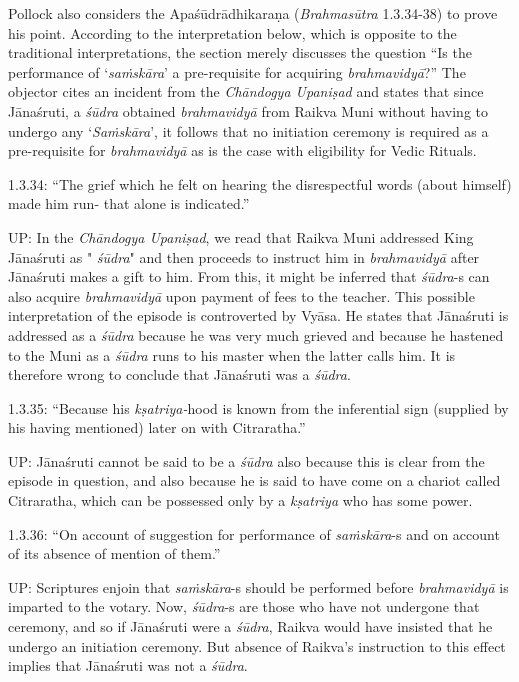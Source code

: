 Pollock also considers the Apaśūdrādhikaraṇa (\textit{Brahmasūtra} 1.3.34-38) to prove his point. According to the interpretation below, which is opposite to the traditional interpretations, the section merely discusses the question “Is the performance of ‘\textit{saṁskāra}’ a pre-requisite for acquiring \textit{brahmavidyā}?” The objector cites an incident from the \textit{Chāndogya Upaniṣad} and states that since Jānaśruti, a \textit{śūdra} obtained \textit{brahmavidyā} from Raikva Muni without having to undergo any `\textit{Saṁskāra}', it follows that no initiation ceremony is required as a pre-requisite for \textit{brahmavidyā} as is the case with eligibility for Vedic Rituals.

1.3.34: “The grief which he felt on hearing the disrespectful words (about himself) made him run- that alone is indicated.”

UP: In the \textit{Chāndogya Upaniṣad}, we read that Raikva Muni addressed King Jānaśruti as "\textit{ śūdra}" and then proceeds to instruct him in \textit{brahmavidyā} after Jānaśruti makes a gift to him. From this, it might be inferred that \textit{śūdra}-s can also acquire \textit{brahmavidyā} upon payment of fees to the teacher. This possible interpretation of the episode is controverted by Vyāsa. He states that Jānaśruti is addressed as a \textit{śūdra} because he was very much grieved and because he hastened to the Muni as a \textit{śūdra} runs to his master when the latter calls him. It is therefore wrong to conclude that Jānaśruti was a \textit{śūdra}.

1.3.35: “Because his \textit{kṣatriya-}hood is known from the inferential sign (supplied by his having mentioned) later on with Citraratha.”

UP: Jānaśruti cannot be said to be a \textit{śūdra} also because this is clear from the episode in question, and also because he is said to have come on a chariot called Citraratha, which can be possessed only by a \textit{kṣatriya} who has some power.

1.3.36: “On account of suggestion for performance of \textit{saṁskāra}-s and on account of its absence of mention of them.”

UP: Scriptures enjoin that \textit{saṁskāra}-s should be performed before \textit{brahmavidyā} is imparted to the votary. Now, \textit{śūdra}-s are those who have not undergone that ceremony, and so if Jānaśruti were a \textit{śūdra}, Raikva would have insisted that he undergo an initiation ceremony. But absence of Raikva's instruction to this effect implies that Jānaśruti was not a \textit{śūdra}.

